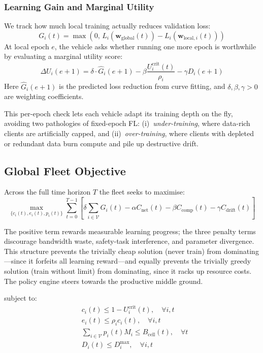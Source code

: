 \documentclass[conference]{IEEEtran}
\begin{document}
\subsubsection{Learning Gain and Marginal Utility}
We track how much local training actually reduces validation loss:
\begin{equation}
G_i(t) = \max\left(0,\, L_i(\mathbf{w}_{\text{global}}(t)) - L_i(\mathbf{w}_{\text{local}, i}(t))\right)
\end{equation}
At local epoch $e$, the vehicle asks whether running one more epoch is worthwhile by evaluating a marginal utility score:
\begin{equation}
\Delta U_i(e+1) = \delta \cdot \widehat{G}_i(e+1) - \beta \frac{U_i^{\text{crit}}(t)}{\rho_i} - \gamma D_i(e+1)
\label{eq:marginal_utility}
\end{equation}
Here $\widehat{G}_i(e{+}1)$ is the predicted loss reduction from curve fitting, and $\delta, \beta, \gamma > 0$ are weighting coefficients.

This per-epoch check lets each vehicle adapt its training depth on the fly, avoiding two pathologies of fixed-epoch FL: (i)~\emph{under-training}, where data-rich clients are artificially capped, and (ii)~\emph{over-training}, where clients with depleted or redundant data burn compute and pile up destructive drift.

\subsection{Global Fleet Objective}
Across the full time horizon $T$ the fleet seeks to maximise:
\begin{equation}
\max_{\{c_i(t), e_i(t), p_i(t)\}} \sum_{t=0}^{T-1} \left[ \delta \sum_{i \in \mathcal{V}} G_i(t) - \alpha C_{\text{net}}(t) - \beta C_{\text{comp}}(t) - \gamma C_{\text{drift}}(t) \right]
\label{eq:global_opt}
\end{equation}

The positive term rewards measurable learning progress; the three penalty terms discourage bandwidth waste, safety-task interference, and parameter divergence. This structure prevents the trivially cheap solution (never train) from dominating---since it forfeits all learning reward---and equally prevents the trivially greedy solution (train without limit) from dominating, since it racks up resource costs. The policy engine steers towards the productive middle ground.

\noindent subject to:
\begin{align}
& c_i(t) \le 1 - U_i^{\text{crit}}(t), \quad \forall i, t \label{eq:slack_constraint} \\
& e_i(t) \le \rho_i c_i(t), \quad \forall i, t \label{eq:epochs_constraint} \\
& \sum_{i \in \mathcal{V}} p_i(t) M_i \le B_{\text{cell}}(t), \quad \forall t \label{eq:cell_constraint} \\
& D_i(t) \le D_i^{\text{max}}, \quad \forall i, t \label{eq:drift_constraint}
\end{align}
\end{document}
